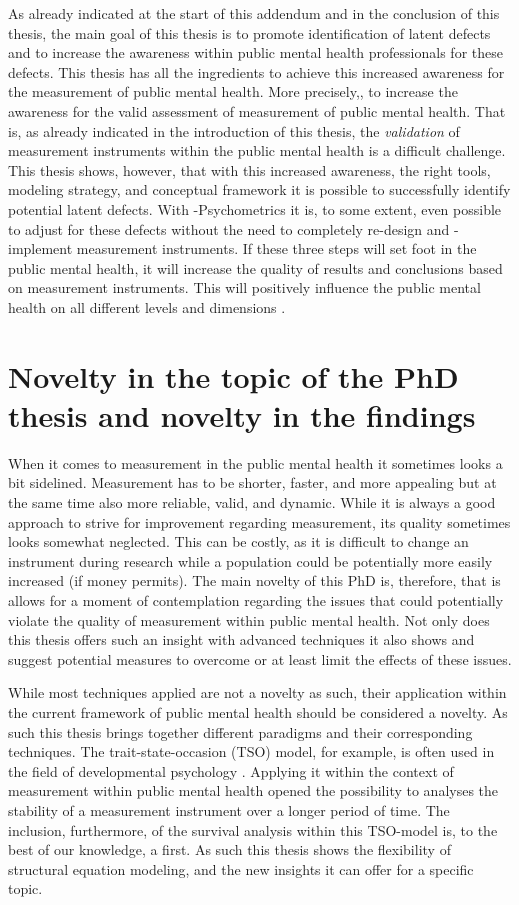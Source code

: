 As already indicated at the start of this addendum and in the conclusion of this thesis, the main goal of this thesis is to promote identification of latent defects and to increase the awareness within public mental health professionals for these defects. This thesis has all the ingredients to achieve this increased awareness for the measurement of public mental health. More precisely,, to increase the awareness for the valid assessment of measurement of public mental health. That is, as already indicated in the introduction of this thesis, the \textit{validation} of measurement instruments within the public mental health is a difficult challenge. This thesis shows, however, that with this increased awareness, the right tools, modeling strategy, and conceptual framework it is possible to successfully identify potential latent defects. With \textbeta-Psychometrics it is, to some extent, even possible to adjust for these defects without the need to completely re-design and -implement measurement instruments. If these three steps will set foot in the public mental health, it will increase the quality of results and conclusions based on measurement instruments. This will positively influence the public mental health on all different levels and dimensions \parencite{WHO_2001}.

\section*{Novelty in the topic of the PhD thesis and novelty in the findings}
When it comes to measurement in the public mental health it sometimes looks a bit sidelined. Measurement has to be shorter, faster, and more appealing but at the same time also more reliable, valid, and dynamic. While it is always a good approach to strive for improvement regarding measurement, its quality sometimes looks somewhat neglected. This can be costly, as it is difficult to change an instrument during research while a population could be potentially more easily increased (if money permits). The main novelty of this PhD is, therefore, that is allows for a moment of contemplation regarding the issues that could potentially violate the quality of measurement within public mental health. Not only does this thesis offers such an insight with advanced techniques it also shows and suggest potential measures to overcome or at least limit the effects of these issues. 

While most techniques applied are not a novelty as such, their application within the current framework of public mental health should be considered a novelty. As such this thesis brings together different paradigms and their corresponding techniques. The trait-state-occasion (TSO) model, for example, is often used in the field of developmental psychology \parencite{Cole_2012}. Applying it within the context of measurement within public mental health opened the possibility to analyses the stability of a measurement instrument over a longer period of time. The inclusion, furthermore, of the survival analysis within this TSO-model is, to the best of our knowledge, a first. As such this thesis shows the flexibility of structural equation modeling, and the new insights it can offer for a specific topic. 

